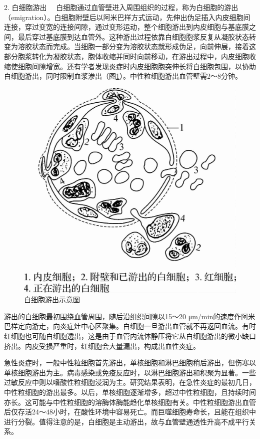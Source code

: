 {2. 白细胞游出}
　白细胞通过血管壁进入周围组织的过程，称为白细胞的游出（emigration）。白细胞附壁后以阿米巴样方式运动，先伸出伪足插入内皮细胞间连接，穿过变宽的连接间隙，通过变形运动，整个细胞游出到内皮细胞与基底膜之间，最后穿过基底膜到达血管外。这种游出过程依靠白细胞胞浆反复从凝胶状态转变为溶胶状态而完成。当细胞一部分变为溶胶状态就形成伪足，向前伸展，接着这部分胞浆转化为凝胶状态，胞体收缩并同时向前移动，在游出过程中，内皮细胞收缩使细胞间隙增宽。还有学者发现炎症时内皮细胞胞突伸长将白细胞包围，以协助白细胞游出，同时限制血浆渗出（图\ref{fig4-2}）。中性粒细胞游出血管壁需2～8分钟。

\begin{figure}[!htbp]
 \centering
 \includegraphics[scale=1.2]{./images/Image00052.jpg}
 \caption{白细胞游出示意图}
 \label{fig4-2}
  \end{figure} 

游出的白细胞最初围绕血管周围，随后沿组织间隙以15～20
μm/min的速度作阿米巴样定向游走，向炎症灶中心区聚集。白细胞一旦游出血管就不再返回血流。有时红细胞也可随白细胞透出，这是由于血管内流体静压将它从白细胞游出的微小缺口挤出。内皮受损严重时，红细胞会大量漏出，构成出血性炎症。

急性炎症时，一般中性粒细胞首先游出，单核细胞和淋巴细胞稍后游出，但伤寒以单核细胞游出为主。病毒感染或免疫反应时，以淋巴细胞游出和积聚为显著。一些过敏反应中则以嗜酸性粒细胞浸润为主。研究结果表明，在急性炎症的最初几日，中性粒细胞的游出最多。以后，单核细胞逐渐增多，超过中性粒细胞，且持续时间亦长。这可能与中性粒细胞的溶酶体酶能趋化单核细胞有关。中性粒细胞游出血管后仅存活24～48小时，在酸性环境中容易死亡。而巨噬细胞寿命长，且能在组织中进行分裂。值得注意的是，白细胞是主动游出，故与血管壁通透性升高不成平行关系。

